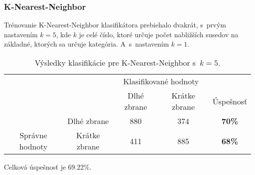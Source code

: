 \subsubsection{K-Nearest-Neighbor}
Trénovanie K-Nearest-Neighbor klasifikátora prebiehalo dvakrát, s~prvým nastavením $k=5$, kde $k$ je celé číslo, ktoré určuje
    počet nabližších susedov na základné, ktorých sa určuje kategória.
A~s~nastavením $k=1$.

\begin{table}[H]
    \centering
    \begin{tabular}{ccccc}
                                                                &                                    & \multicolumn{2}{c}{Klasifikované hodnoty}                                                         &                                    \\ \cline{3-5} 
                                                                & \multicolumn{1}{c|}{}              & \multicolumn{1}{c|}{Dlhé zbrane}                & \multicolumn{1}{c|}{Krátke zbrane}              & \multicolumn{1}{c|}{Úspešnosť}     \\ \cline{2-5} 
        \multicolumn{1}{c|}{}                                  & \multicolumn{1}{c|}{Dlhé zbrane}   & \multicolumn{1}{c|}{{\color[HTML]{009901} 880}} & \multicolumn{1}{c|}{{\color[HTML]{9A0000} 374}} & \multicolumn{1}{c|}{\textbf{70\%}} \\ \cline{2-5} 
        \multicolumn{1}{c|}{\multirow{-2}{*}{Správne hodnoty}} & \multicolumn{1}{c|}{Krátke zbrane} & \multicolumn{1}{c|}{{\color[HTML]{9A0000} 411}} & \multicolumn{1}{c|}{{\color[HTML]{009901} 885}} & \multicolumn{1}{c|}{\textbf{68\%}} \\ \cline{2-5} 
    \end{tabular}
    \caption{Výsledky klasifikácie pre K-Nearest-Neighbor s~$k=5$.}
    \label{tab:kmeans5}
\end{table}
Celková úspešnosť je 69.22\%.

